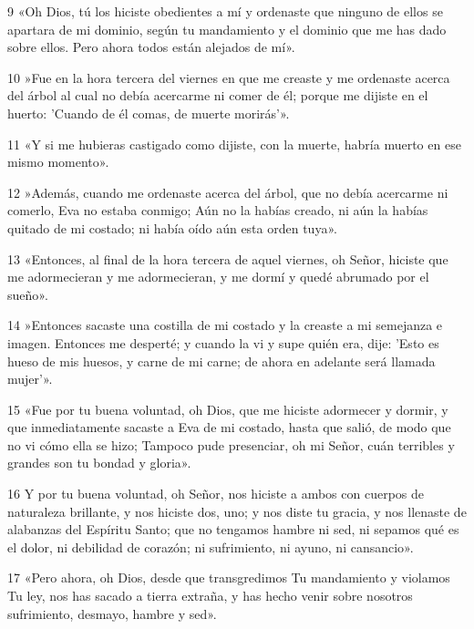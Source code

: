 \par 9 «Oh Dios, tú los hiciste obedientes a mí y ordenaste que ninguno de ellos se apartara de mi dominio, según tu mandamiento y el dominio que me has dado sobre ellos. Pero ahora todos están alejados de mí».

\par 10 »Fue en la hora tercera del viernes en que me creaste y me ordenaste acerca del árbol al cual no debía acercarme ni comer de él; porque me dijiste en el huerto: 'Cuando de él comas, de muerte morirás'».

\par 11 «Y si me hubieras castigado como dijiste, con la muerte, habría muerto en ese mismo momento».

\par 12 »Además, cuando me ordenaste acerca del árbol, que no debía acercarme ni comerlo, Eva no estaba conmigo; Aún no la habías creado, ni aún la habías quitado de mi costado; ni había oído aún esta orden tuya».

\par 13 «Entonces, al final de la hora tercera de aquel viernes, oh Señor, hiciste que me adormecieran y me adormecieran, y me dormí y quedé abrumado por el sueño».

\par 14 »Entonces sacaste una costilla de mi costado y la creaste a mi semejanza e imagen. Entonces me desperté; y cuando la vi y supe quién era, dije: 'Esto es hueso de mis huesos, y carne de mi carne; de ahora en adelante será llamada mujer'».

\par 15 «Fue por tu buena voluntad, oh Dios, que me hiciste adormecer y dormir, y que inmediatamente sacaste a Eva de mi costado, hasta que salió, de modo que no vi cómo ella se hizo; Tampoco pude presenciar, oh mi Señor, cuán terribles y grandes son tu bondad y gloria».

\par 16 Y por tu buena voluntad, oh Señor, nos hiciste a ambos con cuerpos de naturaleza brillante, y nos hiciste dos, uno; y nos diste tu gracia, y nos llenaste de alabanzas del Espíritu Santo; que no tengamos hambre ni sed, ni sepamos qué es el dolor, ni debilidad de corazón; ni sufrimiento, ni ayuno, ni cansancio».

\par 17 «Pero ahora, oh Dios, desde que transgredimos Tu mandamiento y violamos Tu ley, nos has sacado a tierra extraña, y has hecho venir sobre nosotros sufrimiento, desmayo, hambre y sed».

